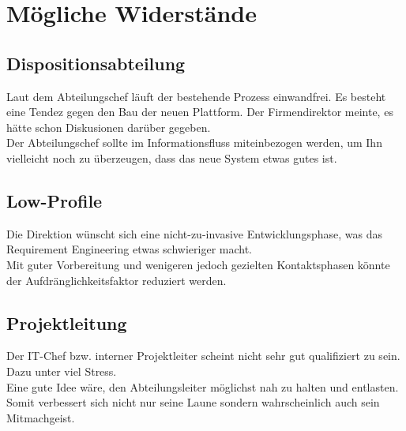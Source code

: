 \section{Mögliche Widerstände}
%
  \subsection{Dispositionsabteilung}
  Laut dem Abteilungschef läuft der bestehende Prozess einwandfrei. Es besteht eine Tendez gegen den Bau der neuen Plattform.
  Der Firmendirektor meinte, es hätte schon Diskusionen darüber gegeben.\\
  Der Abteilungschef sollte im Informationsfluss miteinbezogen werden, um Ihn vielleicht noch zu überzeugen, dass das neue System etwas gutes ist.
  \subsection{Low-Profile}
  Die Direktion wünscht sich eine nicht-zu-invasive Entwicklungsphase, was das Requirement Engineering etwas schwieriger macht.\\
  Mit guter Vorbereitung und wenigeren jedoch gezielten Kontaktsphasen könnte der Aufdränglichkeitsfaktor reduziert werden.
  \subsection{Projektleitung}
  Der IT-Chef bzw. interner Projektleiter scheint nicht sehr gut qualifiziert zu sein. Dazu unter viel Stress.\\
  Eine gute Idee wäre, den Abteilungsleiter möglichst nah zu halten und entlasten.
  Somit verbessert sich nicht nur seine Laune sondern wahrscheinlich auch sein Mitmachgeist. 
